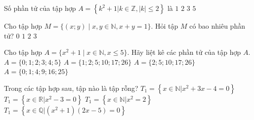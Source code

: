 \begin{ex}%
	Số phần tử của tập  hợp $A=\left\{k^2+1\big|k\in \mathbb{Z}, |k|\le 2\right\}$ là
	 \choice
		{$1$} 
		{$2$} 
		{\True $3$} 
		{$5$} 
\end{ex}

\begin{ex}%
	Cho  tập hợp $M = \{(x; y) \mid x, y \in \mathbb{N}, x + y = 1\}$. Hỏi tập $M$ có bao nhiêu phần tử?
	 \choice
		 {$0$}
		 {$1$}
		 {\True $2$}
		{$3$} 
\end{ex}

\begin{ex}%
	Cho tập hợp $A = \{x^2 + 1 \mid x \in \mathbb{N}, x \leq 5\}$. Hãy  liệt kê các phần tử của tập hợp $A$.
	\choice 
		{$A  = \{0; 1; 2; 3; 4; 5\}$}
		{\True $A = \{1; 2; 5; 10; 17;  26\}$}
		{$A = \{2; 5; 10; 17; 26\}$} 
		{$A  = \{0; 1; 4; 9; 16; 25\}$}
\end{ex}

\begin{ex}%
	Trong các tập hợp sau, tập nào  là tập rỗng?
	 \choice
		{$T_1=\left\{x\in \mathbb{N}\big|x^2+3x-4=0\right\}$} 
		{$T_1=\left\{x\in  \mathbb{R}\big|x^2-3=0\right\}$}
		{\True $T_1=\left\{x\in  \mathbb{N}\big|x^2=2\right\}$}
		{$T_1=\left\{x\in  \mathbb{Q}\big|\left(x^2+1\right)\left(2x-5\right)=0\right\}$}
\end{ex}

